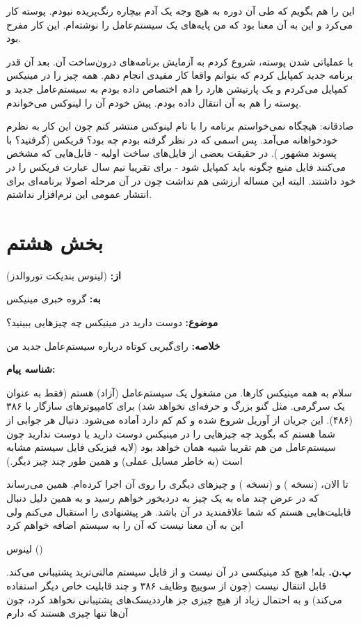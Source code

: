 این را هم بگویم که طی آن دوره به هیچ وجه یک آدم بیچاره رنگ‌پریده
نبودم. پوسته کار می‌کرد و این به آن معنا بود که من پایه‌های یک سیستم‌عامل
را نوشته‌ام. این کار مفرح بود.

با عملیاتی شدن پوسته، شروع کردم به آزمایش برنامه‌های درون‌‌ساخت آن. بعد
آن قدر برنامه جدید کمپایل کردم که بتوانم واقعا کار مفیدی انجام
دهم. همه چیز را در مینیکس کمپایل می‌کردم و یک پارتیشن هارد را هم اختصاص
داده بودم به سیستم‌عامل جدید و پوسته را هم به آن انتقال داده بودم. پیش
خودم آن را لینوکس می‌خواندم.

صادقانه: هیچگاه نمی‌خواستم برنامه را با نام لینوکس منتشر کنم چون این
کار به نظرم خودخواهانه می‌آمد. پس اسمی که در نظر گرفته بودم چه بود؟‌
فریکس (گرفتید؟  با پسوند مشهور
). در حقیقت بعضی از فایل‌های ساخت
اولیه - فایل‌هایی که مشخص می‌کنند فایل منبع چگونه باید کمپایل شود - برای
تقریبا نیم سال عبارت فریکس را در خود داشتند. البته این مساله ارزشی هم
نداشت چون در آن مرحله اصولا برنامه‌ای برای انتشار عمومی این نرم‌افزار
نداشتم.

\section{بخش هشتم}
\begin{emailbox}
\noindent\textbf{از:}  (لینوس بندیکت
توروالدز)

\noindent\textbf{به:} گروه خبری مینیکس 

\noindent\textbf{موضوع:} دوست دارید در مینیکس چه چیزهایی ببینید؟

\noindent\textbf{خلاصه:} رای‌گیریی کوتاه درباره سیستم‌عامل جدید من

\noindent\textbf{شناسه پیام:}

سلام به همه مینیکس کارها. من مشغول یک سیستم‌عامل (آزاد) هستم (فقط به
عنوان یک سرگرمی. مثل گنو بزرگ و حرفه‌ای نخواهد شد) برای کامپیوترهای
سازگار با ۳۸۶ (۴۸۶). این جریان از آوریل شروع شده و کم کم دارد آماده
می‌شود. دنبال هر جوابی از شما هستم که بگوید چه چیزهایی را در مینیکس
دوست دارید یا دوست ندارید چون سیستم‌عامل من هم تقریبا شبیه همان خواهد
بود (لایه فیزیکی فایل سیستم مشابه است (به خاطر مسایل عملی) و همین طور
چند چیز دیگر.)

تا الان،  (نسخه ) و  (نسخه
) و چیزهای دیگری را روی آن اجرا کرده‌ام. همین می‌رساند که در
عرض چند ماه به یک چیز به دردبخور خواهم رسید و به همین دلیل دنبال
قابلیت‌هایی هستم که شما علاقمندید در آن باشد. هر پیشنهادی را استقبال
می‌کنم ولی این به آن معنا نیست که آن را به سیستم اضافه خواهم کرد \code{:-)}

\hfill لینوس ()

\noindent\textbf{پ.ن.} بله! هیچ کد مینیکسی در آن نیست و از فایل سیستم
مالتی‌ترید پشتیبانی می‌کند. قابل انتقال نیست (چون از سوییچ وظایف ۳۸۶ و
چند قابلیت خاص دیگر استفاده می‌کند) و به احتمال زیاد از هیچ چیزی جز
هارددیسک‌های  پشتیبانی نخواهد کرد، چون آن‌ها تنها چیزی هستند که دارم
\code{:-(}
\end{emailbox}


